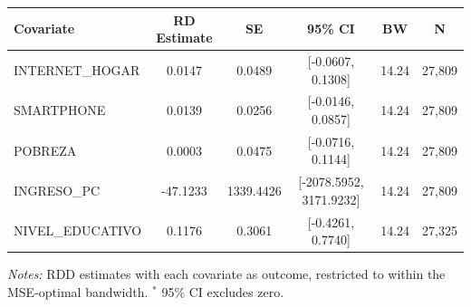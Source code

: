 \begin{threeparttable}
\begin{tabular}{l ccccc}
\toprule
Covariate & RD Estimate & SE & 95\% CI & BW & N \\
\midrule
  INTERNET\_HOGAR & 0.0147 & 0.0489 & [-0.0607, 0.1308] & 14.24 & 27{,}809 \\
  SMARTPHONE & 0.0139 & 0.0256 & [-0.0146, 0.0857] & 14.24 & 27{,}809 \\
  POBREZA & 0.0003 & 0.0475 & [-0.0716, 0.1144] & 14.24 & 27{,}809 \\
  INGRESO\_PC & -47.1233 & 1339.4426 & [-2078.5952, 3171.9232] & 14.24 & 27{,}809 \\
  NIVEL\_EDUCATIVO & 0.1176 & 0.3061 & [-0.4261, 0.7740] & 14.24 & 27{,}325 \\
\bottomrule
\end{tabular}
\begin{tablenotes}
\small
\item \textit{Notes:} RDD estimates with each covariate as outcome, restricted to within the MSE-optimal bandwidth. $^{*}$ 95\% CI excludes zero.
\end{tablenotes}
\end{threeparttable}